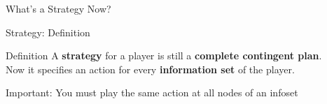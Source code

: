 
\begin{frame}[standout]
What's a Strategy Now?
\end{frame}

\begin{frame}{Strategy: Definition}
\begin{block}{Definition}
A \textbf{strategy} for a player is still a \textbf{complete contingent plan}.\\
Now it specifies an action for every \textbf{information set} of the player.
\end{block}
\bsk
Important: You must play the same action at all nodes of an infoset
\end{frame}


